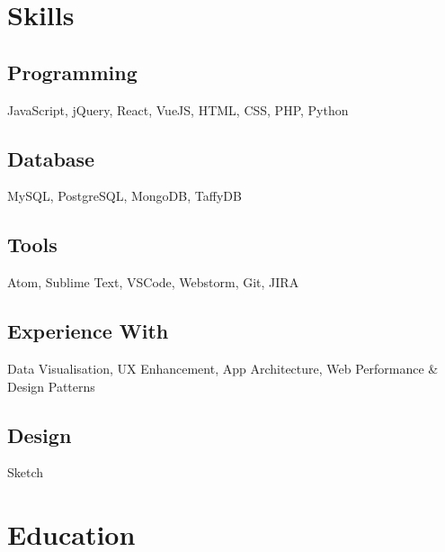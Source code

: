 \documentclass[]{gagan-resume}
\begin{document}
\lastupdated






\begin{minipage}[t]{0.33\textwidth} 




\section{Skills}
\subsection{Programming}
JavaScript, jQuery, React, VueJS, HTML, CSS, PHP, Python
\subsection{Database}
MySQL, PostgreSQL, MongoDB, TaffyDB
\subsection{Tools}
Atom, Sublime Text, VSCode, Webstorm, Git, JIRA
\subsection{Experience With}
Data Visualisation, UX Enhancement, App Architecture, Web Performance \& Design Patterns
\subsection{Design}
Sketch
\sectionsep




\section{Education} 


\end{minipage}
\end{document}
